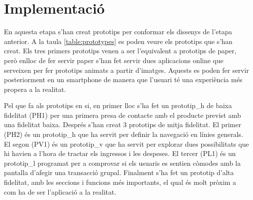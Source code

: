 
\section{Implementació}
En aquesta etapa s'han creat prototips per conformar els dissenys de l'etapa anterior. A la taula \ref{table:prototypes} es poden veure els prototips que s'han creat. Els tres primers prototips venen a ser l'equivalent a prototips de paper, però enlloc de fer servir paper s'han fet servir dues aplicacions online que serveixen per fer prototips animats a partir d'imatges. Aquests es poden fer servir posteriorment en un \gls{smartphone} de manera que l'usuari té una experiència més propera a la realitat.

Pel que fa als prototips en si, en primer lloc s'ha fet un \gls{prototip_h} de baixa fidelitat (PH1) per una primera presa de contacte amb el producte previst amb una fidelitat baixa. Després s'han creat 3 prototips de mitja fidelitat. El primer (PH2) és un \gls{prototip_h} que ha servit per definir la navegació en línies generals. El segon (PV1) és un \gls{prototip_v} que ha servit per explorar dues possibilitats que hi havien a l'hora de tractar els ingressos i les despeses. El tercer (PL1) és un \gls{prototip_l} programat per a comprovar si els usuaris es sentien còmodes amb la pantalla d'afegir una transacció grupal. Finalment s'ha fet un prototip d'alta fidelitat, amb les seccions i funcions més importants, el qual és molt pròxim a com ha de ser l'aplicació a la realitat. 

